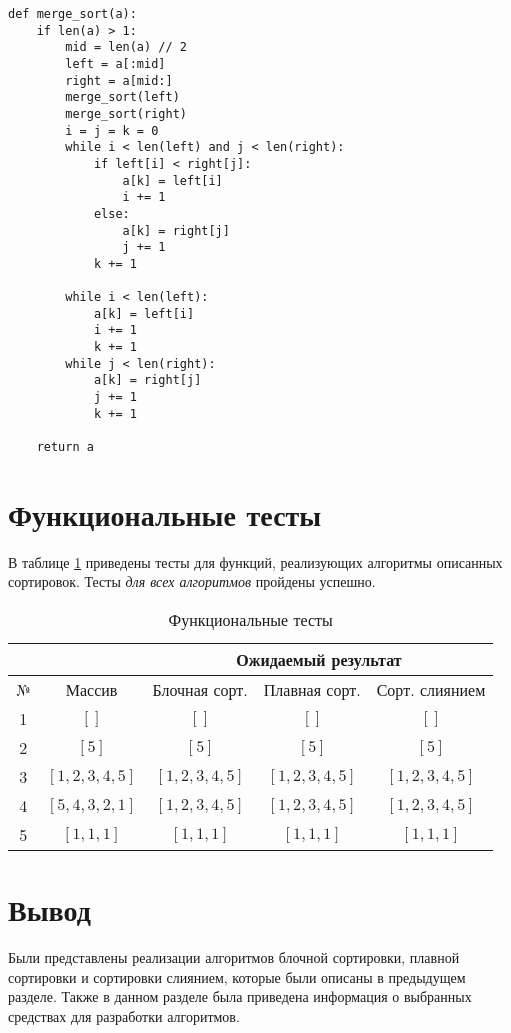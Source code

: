 \begin{center}
	\captionsetup{justification=raggedright,singlelinecheck=off}
	\begin{lstlisting}[label=lst:merge,caption=Реализация алгоритма сортировки слиянием]
def merge_sort(a):
	if len(a) > 1:
		mid = len(a) // 2
		left = a[:mid]
		right = a[mid:]
		merge_sort(left)
		merge_sort(right)
		i = j = k = 0
		while i < len(left) and j < len(right):
			if left[i] < right[j]:
				a[k] = left[i]
				i += 1
			else:
				a[k] = right[j]
				j += 1
			k += 1
		
		while i < len(left):
			a[k] = left[i]
			i += 1
			k += 1
		while j < len(right):
			a[k] = right[j]
			j += 1
			k += 1
	
	return a
	\end{lstlisting}
\end{center}

\section{Функциональные тесты}

В таблице \ref{tbl:functional_test} приведены тесты для функций, реализующих алгоритмы описанных сортировок. Тесты \textit{для всех алгоритмов} пройдены успешно.

\begin{table}[H]
	\begin{center}
		\begin{threeparttable}
			\captionsetup{justification=raggedright,singlelinecheck=off}
			\caption{\label{tbl:functional_test} Функциональные тесты}
			\begin{tabular}{|c|c|c|c|c|}
				\hline
				&&\multicolumn{3}{c|}{Ожидаемый результат} \\
				\hline
				№&Массив&Блочная сорт.&Плавная сорт.&Сорт. слиянием \\
				\hline
				1&$[]$&$[]$&$[]$&$[]$ \\
				\hline
				2&$[5]$&$[5]$&$[5]$&$[5]$ \\
				\hline
				3&$[1, 2, 3, 4, 5]$&$[1, 2, 3, 4, 5]$&$[1, 2, 3, 4, 5]$&$[1, 2, 3, 4, 5]$ \\
				\hline
				4&$[5, 4, 3, 2, 1]$&$[1, 2, 3, 4, 5]$&$[1, 2, 3, 4, 5]$&$[1, 2, 3, 4, 5]$ \\
				\hline
				5&$[1, 1, 1]$&$[1, 1, 1]$&$[1, 1, 1]$&$[1, 1, 1]$ \\
				\hline
			\end{tabular}
		\end{threeparttable}
	\end{center}
\end{table}

\section{Вывод}

Были представлены реализации алгоритмов блочной сортировки, плавной сортировки и сортировки слиянием, которые были описаны в предыдущем разделе. Также в данном разделе была приведена информация о выбранных средствах для разработки алгоритмов.